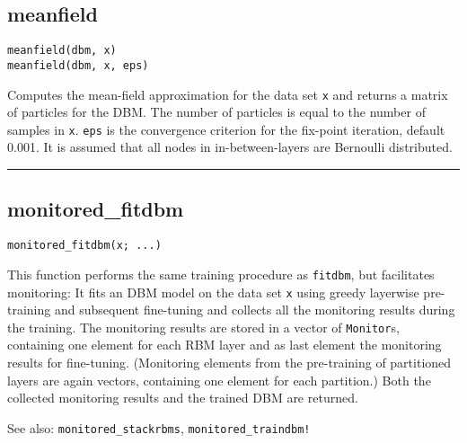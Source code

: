 \subsection*{meanfield}
\begin{verbatim}
meanfield(dbm, x)
meanfield(dbm, x, eps)
\end{verbatim}
Computes the mean-field approximation for the data set \texttt{x} and returns a matrix of particles for the DBM. The number of particles is equal to the number of samples in \texttt{x}. \texttt{eps} is the convergence criterion for the fix-point iteration, default 0.001. It is assumed that all nodes in in-between-layers are Bernoulli distributed.

\noindent\rule{\textwidth}{1pt}
\subsection*{monitored\_fitdbm}
\begin{verbatim}
monitored_fitdbm(x; ...)
\end{verbatim}
This function performs the same training procedure as \texttt{fitdbm}, but facilitates monitoring: It fits an DBM model on the data set \texttt{x} using greedy layerwise pre-training and subsequent fine-tuning and collects all the monitoring results during the training. The monitoring results are stored in a vector of \texttt{Monitor}s, containing one element for each RBM layer and as last element the monitoring results for fine-tuning. (Monitoring elements from the pre-training of partitioned layers are again vectors, containing one element for each partition.) Both the collected monitoring results and the trained DBM are returned.

See also: \texttt{monitored\_stackrbms}, \texttt{monitored\_traindbm!}

